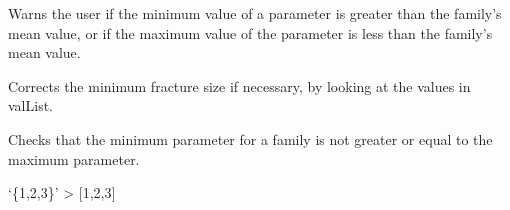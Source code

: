 \documentclass[letterpaper,10pt,english]{sphinxmanual}
\begin{document}
\begin{fulllineitems}

\begin{fulllineitems}
\label{\detokenize{pydfnworks:pydfnworks.dfnGen.gen_input.input_helper.check_mean}}
Warns the user if the minimum value of a parameter is greater than the family’s mean value, or if the
maximum value of the parameter is less than the family’s mean value.

\end{fulllineitems}


\begin{fulllineitems}
\label{\detokenize{pydfnworks:pydfnworks.dfnGen.gen_input.input_helper.check_min_frac_size}}
Corrects the minimum fracture size if necessary, by looking at the values in valList.

\end{fulllineitems}


\begin{fulllineitems}
\label{\detokenize{pydfnworks:pydfnworks.dfnGen.gen_input.input_helper.check_min_max}}
Checks that the minimum parameter for a family is not greater or equal to the maximum parameter.

\end{fulllineitems}


\begin{fulllineitems}
\label{\detokenize{pydfnworks:pydfnworks.dfnGen.gen_input.input_helper.curly_to_list}}
‘\{1,2,3\}’ \textendash{}\textgreater{} {[}1,2,3{]}


\end{fulllineitems}
\end{fulllineitems}
\end{document}
